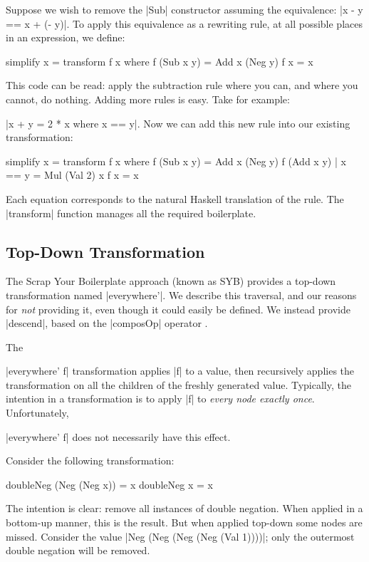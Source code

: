 \begin{example}
\label{exU:simplify}
Suppose we wish to remove the |Sub| constructor assuming the equivalence: |x - y == x + (- y)|. To apply this equivalence as a rewriting rule, at all possible places in an expression, we define:

\begin{code}
simplify x = transform f x
    where  f (Sub x y)  = Add x (Neg y)
           f x          = x
\end{code}

This code can be read: apply the subtraction rule where you can, and where you cannot, do nothing. Adding more rules is easy. Take for example: \ignore|x + y = 2 * x where x == y|. Now we can add this new rule into our existing transformation:

\begin{code}
simplify x = transform f x
    where  f (Sub x y)           = Add x (Neg y)
           f (Add x y) | x == y  = Mul (Val 2) x
           f x                   = x
\end{code}

Each equation corresponds to the natural Haskell translation of the rule. The |transform| function manages all the required boilerplate.
\end{example}

\subsection{Top-Down Transformation}

The Scrap Your Boilerplate approach \cite{lammel:syb} (known as SYB) provides a top-down transformation named |everywhere'|. We describe this traversal, and our reasons for \textit{not} providing it, even though it could easily be defined. We instead provide |descend|, based on the |composOp| operator \cite{bringert:compos}.

The \ignore|everywhere' f| transformation applies |f| to a value, then recursively applies the transformation on all the children of the freshly generated value. Typically, the intention in a transformation is to apply |f| to \textit{every node exactly once}. Unfortunately, \ignore|everywhere' f| does not necessarily have this effect.

\begin{example}
Consider the following transformation:

\begin{code}
doubleNeg (Neg (Neg x))  = x
doubleNeg x              = x
\end{code}

The intention is clear: remove all instances of double negation. When applied in a bottom-up manner, this is the result. But when applied top-down some nodes are missed. Consider the value |Neg (Neg (Neg (Neg (Val 1))))|; only the outermost double negation will be removed.
\end{example}

